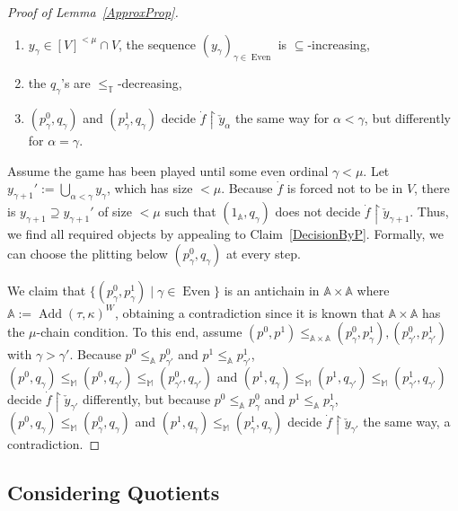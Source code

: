 \documentclass[a4paper]{amsart}
\theoremstyle{definition}
\theoremstyle{remark}
\newtheorem{mybem}[mydef]{Remark}
\theoremstyle{plain}
\numberwithin{mydef}{section}
\DeclareMathOperator{\Add}{Add}
\DeclareMathOperator{\Even}{Even}
\newcommand{\dA}{\mathbb{A}}
\newcommand{\dM}{\mathbb{M}}
\newcommand{\dT}{\mathbb{T}}
\newcommand{\uhr}{\upharpoonright}
\begin{document}
\begin{proof}[Proof of Lemma~\ref{ApproxProp}]
	
		\begin{enumerate}
			\item $y_{\gamma}\in [V]^{<\mu}\cap V$, the sequence $(y_{\gamma})_{\gamma\in\Even}$ is $\subseteq$-increasing,
			\item the $q_\gamma$'s are $\le_\dT$-decreasing,
			\item $(p_{\gamma}^0,q_{\gamma})$ and $(p_{\gamma}^1,q_{\gamma})$ decide $\dot{f}\uhr \check{y}_{\alpha}$ the same way for $\alpha<\gamma$, but differently for $\alpha=\gamma$.
		\end{enumerate}
		Assume the game has been played until some even ordinal $\gamma<\mu$. Let $y_{\gamma+1}':=\bigcup_{\alpha<\gamma}y_{\gamma}$, which has size $<\mu$. Because $\dot{f}$ is forced not to be in $V$, there is $y_{\gamma+1}\supseteq y_{\gamma+1}'$ of size $<\mu$ such that $(1_{\dA},q_{\gamma})$ does not decide $\dot{f}\uhr\check{y}_{\gamma+1}$. Thus, we find all required objects by appealing to Claim~\ref{DecisionByP}. Formally, we can choose the plitting below $(p_\gamma^0,q_\gamma)$ at every step.
		
		
		We claim that $\{(p_{\gamma}^0,p_{\gamma}^1)\;|\;\gamma\in\Even\}$ is an antichain in $\dA \times \dA$ where $\dA:=\Add(\tau,\kappa)^W$, obtaining a contradiction since it is known that $\dA \times \dA$ has the $\mu$-chain condition. To this end, assume $(p^0,p^1) \le_{\dA \times \dA} (p_{\gamma}^0,p_{\gamma}^1),(p_{\gamma'}^0,p_{\gamma'}^1)$ with $\gamma>\gamma'$. Because $p^0 \le_{\dA} p_{\gamma'}^0$ and $p^1 \le_{\dA} p_{\gamma'}^1$, $(p^0,q_{\gamma}) \le_{\dM} (p^0,q_{\gamma'}) \le_{\dM} (p_{\gamma'}^0,q_{\gamma'})$ and $(p^1,q_{\gamma}) \le_{\dM} (p^1,q_{\gamma'}) \le_{\dM} (p_{\gamma'}^1,q_{\gamma'})$ decide $\dot{f}\uhr\check{y}_{\gamma'}$ differently, but because $p^0 \le_{\dA} p_{\gamma}^0$ and $p^1 \le_{\dA} p_{\gamma}^1$, $(p^0,q_{\gamma}) \le_{\dM} (p_{\gamma}^0,q_{\gamma})$ and $(p^1,q_{\gamma}) \le_{\dM} (p_{\gamma}^1, q_{\gamma})$ decide $\dot{f}\uhr\check{y}_{\gamma'}$ the same way, a contradiction.
	\end{proof}
	

	
	
	\subsection{Considering Quotients}
\end{document}
